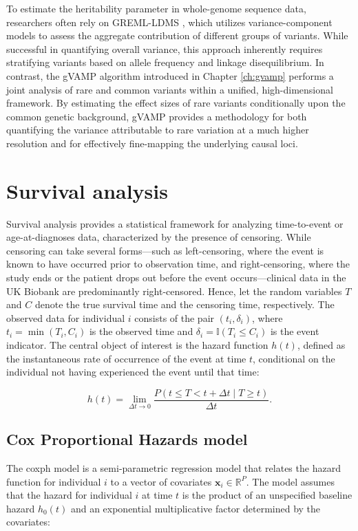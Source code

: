 To estimate the heritability parameter in whole-genome sequence data, researchers often rely on GREML-LDMS \cite{missing_heritability_ht}, which utilizes variance-component models to assess the aggregate contribution of different groups of variants. While successful in quantifying overall variance, this approach inherently requires stratifying variants based on allele frequency and linkage disequilibrium. In contrast, the gVAMP algorithm introduced in Chapter \ref{ch:gvamp} performs a joint analysis of rare and common variants within a unified, high-dimensional framework. By estimating the effect sizes of rare variants conditionally upon the common genetic background, gVAMP provides a methodology for both quantifying the variance attributable to rare variation at a much higher resolution and for effectively fine-mapping the underlying causal loci.

\section{Survival analysis}
Survival analysis provides a statistical framework for analyzing time-to-event or age-at-diagnoses data, characterized by the presence of censoring. While censoring can take several forms---such as left-censoring, where the event is known to have occurred prior to observation time, and right-censoring, where the study ends or the patient drops out before the event occurs---clinical data in the UK Biobank are predominantly right-censored. Hence, let the random variables $T$ and $C$ denote the true survival time and the censoring time, respectively. The observed data for individual $i$ consists of the pair $(t_i, \delta_i)$, where $t_i = \min(T_i, C_i)$ is the observed time and $\delta_i = \mathbb{I}(T_i \leq C_i)$ is the event indicator. The central object of interest is the hazard function $h(t)$, defined as the instantaneous rate of occurrence of the event at time $t$, conditional on the individual not having experienced the event until that time:

\begin{equation}
    h(t) = \lim_{\Delta t \to 0} \frac{P(t \le T < t + \Delta t \mid T \ge t)}{\Delta t}.
\end{equation}

\subsection{Cox Proportional Hazards model}
The \gls{coxph} model \cite{coxPH1972} is a semi-parametric regression model that relates the hazard function for individual $i$ to a vector of covariates $\bm{x}_i \in \mathbb{R}^P$. The model assumes that the hazard for individual $i$ at time $t$ is the product of an unspecified baseline hazard $h_0(t)$ and an exponential multiplicative factor determined by the covariates:

